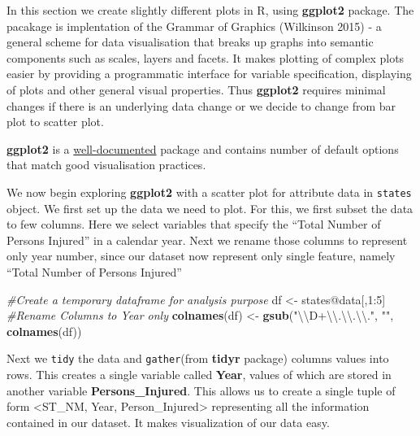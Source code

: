 \documentclass[]{article}
\newenvironment{Shaded}{}{}
\newcommand{\CharTok}[1]{\textcolor[rgb]{0.25,0.44,0.63}{#1}}
\newcommand{\CommentTok}[1]{\textcolor[rgb]{0.38,0.63,0.69}{\textit{#1}}}
\newcommand{\DecValTok}[1]{\textcolor[rgb]{0.25,0.63,0.44}{#1}}
\newcommand{\KeywordTok}[1]{\textcolor[rgb]{0.00,0.44,0.13}{\textbf{#1}}}
\newcommand{\NormalTok}[1]{#1}
\newcommand{\OperatorTok}[1]{\textcolor[rgb]{0.40,0.40,0.40}{#1}}
\newcommand{\StringTok}[1]{\textcolor[rgb]{0.25,0.44,0.63}{#1}}
\begin{document}
In this section we create slightly different plots in R, using
\textbf{ggplot2} package. The pacakage is implentation of the Grammar of
Graphics (Wilkinson 2015) - a general scheme for data visualisation that
breaks up graphs into semantic components such as scales, layers and
facets. It makes plotting of complex plots easier by providing a
programmatic interface for variable specification, displaying of plots
and other general visual properties. Thus \textbf{ggplot2} requires
minimal changes if there is an underlying data change or we decide to
change from bar plot to scatter plot.

\textbf{ggplot2} is a
\href{http://docs.ggplot2.org/current/}{well-documented} package and
contains number of default options that match good visualisation
practices.

We now begin exploring \textbf{ggplot2} with a scatter plot for
attribute data in \texttt{states} object. We first set up the data we
need to plot. For this, we first subset the data to few columns. Here we
select variables that specify the ``Total Number of Persons Injured'' in
a calendar year. Next we rename those columns to represent only year
number, since our dataset now represent only single feature, namely
``Total Number of Persons Injured''

\begin{Shaded}
\begin{Highlighting}[]
\CommentTok{#Create a temporary dataframe for analysis purpose}
\NormalTok{df <-}\StringTok{ }\NormalTok{states}\OperatorTok{@}\NormalTok{data[,}\DecValTok{1}\OperatorTok{:}\DecValTok{5}\NormalTok{]}
\CommentTok{#Rename Columns to Year only}
\KeywordTok{colnames}\NormalTok{(df) <-}\StringTok{ }\KeywordTok{gsub}\NormalTok{(}\StringTok{"}\CharTok{\textbackslash{}\textbackslash{}}\StringTok{D+}\CharTok{\textbackslash{}\textbackslash{}}\StringTok{.}\CharTok{\textbackslash{}\textbackslash{}}\StringTok{.}\CharTok{\textbackslash{}\textbackslash{}}\StringTok{."}\NormalTok{, }\StringTok{""}\NormalTok{, }\KeywordTok{colnames}\NormalTok{(df))}
\end{Highlighting}
\end{Shaded}

Next we \texttt{tidy} the data and
\texttt{\textquotesingle{}gather\textquotesingle{}}(from \textbf{tidyr}
package) columns values into rows. This creates a single variable called
\textbf{Year}, values of which are stored in another variable
\textbf{Persons\_Injured}. This allows us to create a single tuple of
form \textless ST\_NM, Year, Person\_Injured\textgreater{} representing
all the information contained in our dataset. It makes visualization of
our data easy.
\end{document}
